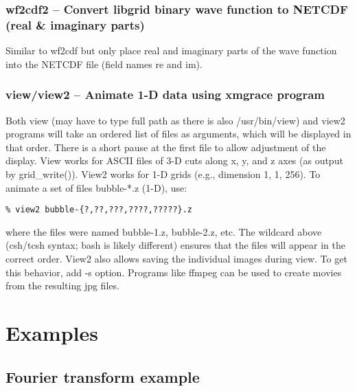\documentclass[12pt,letterpaper]{report}
\begin{document}
\subsection{wf2cdf2 -- Convert libgrid binary wave function to NETCDF (real \& imaginary parts)}

Similar to wf2cdf but only place real and imaginary parts of the wave function into the NETCDF file (field names re and im). 

\subsection{view/view2 -- Animate 1-D data using xmgrace program}

Both view (may have to type full path as there is also /usr/bin/view) and view2 programs will take an ordered list of files as arguments, which will be displayed in that order. There is a short pause at the first file to allow adjustment of the display. View works for ASCII files of 3-D cuts along x, y, and z axes (as output by grid\_write()). View2 works for 1-D grids (e.g., dimension 1, 1, 256). To animate a set of files bubble-*.z (1-D), use:
\begin{verbatim}
% view2 bubble-{?,??,???,????,?????}.z
\end{verbatim}
where the files were named bubble-1.z, bubble-2.z, etc. The wildcard above (csh/tcsh syntax; bash is likely different) ensures that the files will appear in the correct order. View2 also allows saving the individual images during view. To get this behavior, add -s option. Programs like ffmpeg can be used to create movies from the resulting jpg files.

\chapter{Examples}

\section{Fourier transform example}
\end{document}
